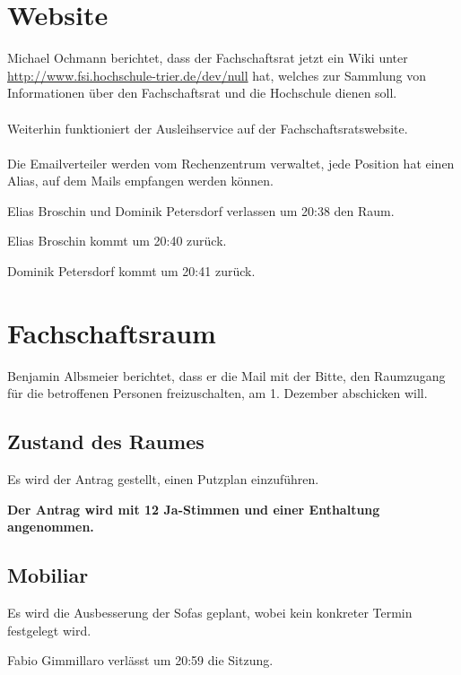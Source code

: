 \documentclass[a4paper, 11pt]{article} %
\begin{document}
\section{Website}
Michael Ochmann berichtet, dass der Fachschaftsrat jetzt ein Wiki unter \url{http://www.fsi.hochschule-trier.de/dev/null} hat, welches zur Sammlung von Informationen über den Fachschaftsrat und die Hochschule dienen soll.
\\\\
Weiterhin funktioniert der Ausleihservice auf der Fachschaftsratswebsite.
\\\\
Die Emailverteiler werden vom Rechenzentrum verwaltet, jede Position hat einen Alias, auf dem Mails empfangen werden können.
\begin{center}
Elias Broschin und Dominik Petersdorf verlassen um 20:38 den Raum.
\end{center}
\begin{center}
Elias Broschin kommt um 20:40 zurück.
\end{center}
\begin{center}
Dominik Petersdorf kommt um 20:41 zurück.
\end{center}

\section{Fachschaftsraum}
Benjamin Albsmeier berichtet, dass er die Mail mit der Bitte, den Raumzugang für die betroffenen Personen freizuschalten, am 1. Dezember abschicken will.

\subsection{Zustand des Raumes}
Es wird der Antrag gestellt, einen Putzplan einzuführen.
\begin{center}
	\textbf{Der Antrag wird mit 12 Ja-Stimmen und einer Enthaltung angenommen.}
\end{center}

\subsection{Mobiliar}
Es wird die Ausbesserung der Sofas geplant, wobei kein konkreter Termin festgelegt wird. 
\begin{center}
	Fabio Gimmillaro verlässt um 20:59 die Sitzung.
\end{center}
\end{document}
